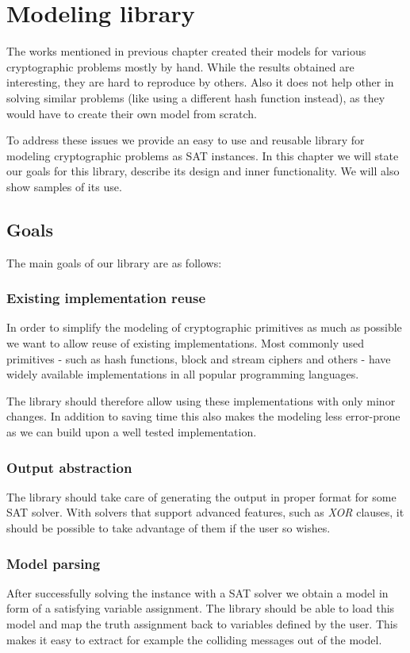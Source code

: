 \chapter{Modeling library}

The works mentioned in previous chapter created their models for various cryptographic problems mostly by hand.
While the results obtained are interesting, they are hard to reproduce by others.
Also it does not help other in solving similar problems (like using a different hash function instead), as they would have to create their own model from scratch.

To address these issues we provide an easy to use and reusable library for modeling cryptographic problems as SAT instances.
In this chapter we will state our goals for this library, describe its design and inner functionality.
We will also show samples of its use.

\section{Goals}
The main goals of our library are as follows:

\subsection{Existing implementation reuse}
In order to simplify the modeling of cryptographic primitives as much as possible we want to allow reuse of existing implementations.
Most commonly used primitives - such as hash functions, block and stream ciphers and others - have widely available implementations in all popular programming languages.

The library should therefore allow using these implementations with only minor changes.
In addition to saving time this also makes the modeling less error-prone as we can build upon a well tested implementation.

\subsection{Output abstraction}
The library should take care of generating the output in proper format for some SAT solver.
With solvers that support advanced features, such as \emph{XOR} clauses, it should be possible to take advantage of them if the user so wishes.

\subsection{Model parsing}
After successfully solving the instance with a SAT solver we obtain a model in form of a satisfying variable assignment.
The library should be able to load this model and map the truth assignment back to variables defined by the user.
This makes it easy to extract for example the colliding messages out of the model.


